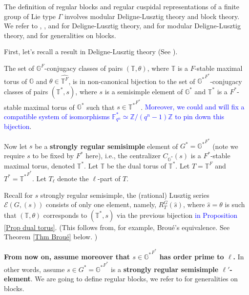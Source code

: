 	The definition of regular blocks and regular cuspidal representations of a finite group of Lie type $\Gamma$ involves modular Deligne-Lusztig theory and block theory. We refer to \cite{deligne1976representations}, \cite{carter1985finite}, and \cite{digne2020representations} for Deligne-Lusztig theory, \cite{michel1989bloc} and \cite{broue1990isometries} for modular Deligne-Lusztig theory, and \cite[Appendix B]{bonnafe2010representations} for generalities on blocks. 
	
	First, let's recall a result in Deligne-Lusztig theory (See \cite[Proposition 11.1.5]{digne2020representations}). 
	
	\begin{proposition}\label{Prop dual torus}
		The set of $\mathbb{G}^F$-conjugacy classes of pairs $(\mathbb{T}, \theta)$, where  $\mathbb{T}$ is a $F$-stable maximal torus of  $\mathbb{G}$ and $\theta \in \widehat{\mathbb{T}^F}$, is in non-canonical bijection to the set of $\mathbb{G^*}^{F^*}$-conjugacy classes of pairs $(\mathbb{T}^*, s)$, where $s$ is a semisimple element of $\mathbb{G}^*$ and $\mathbb{T}^*$ is a $F^*$-stable maximal torus of $\mathbb{G}^*$ such that $s \in {\mathbb{T}^*}^{F^*}$.  \textcolor{blue}{Moreover, we could and will fix a compatible system of isomorphisms $\mathbb{F}_{q^n}^* \simeq \mathbb{Z}/(q^n-1)\mathbb{Z}$ to pin down this bijection}.
	\end{proposition}
	
	Now let $s$ be a \textbf{strongly regular semisimple} 
	element of $G^*={\mathbb{G}^*}^{F^*}$ (note we require $s$ to be fixed by $F^*$ here), i.e., the centralizer $C_{\mathbb{G}^*}(s)$ is a $F^*$-stable maximal torus, denoted $\mathbb{T}^*$. Let $\mathbb{T}$ be the dual torus of $\mathbb{T}^*$. Let $T=\mathbb{T}^F$ and $T^*={\mathbb{T}^*}^{F^*}$. Let $T_\ell$ denote the $\ell$-part of $T$.
	
	Recall for $s$ strongly regular semisimple, the (rational) Lusztig series $\mathcal{E}(G, (s))$ consists of only one element, namely, $R_T^G(\hat{s})$, where $\hat{s}=\theta$ is such that $(\mathbb{T}, \theta)$ corresponds to $(\mathbb{T}^*, s)$ via the previous bijection \textcolor{blue}{in Proposition \ref{Prop dual torus}}. (This follows from, for example, Broué's equivalence. See Theorem \ref{Thm Broué} below.
	)
	
	\textbf{From now on, assume moreover that $s \in {\mathbb{G}^*}^{F^*}$ has order prime to $\ell$.} In other words, assume $s \in G^*={\mathbb{G}^*}^{F^*}$ is a \textbf{strongly regular semisimple $\ell'$-element}. We are going to define regular blocks, we refer to \cite[Appendix B]{bonnafe2010representations} for generalities on blocks.
	
